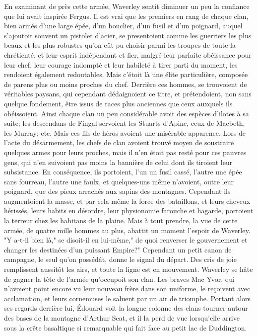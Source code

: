 {En examinant de près cette armée, Waverley sentit diminuer un peu la confiance que lui avait inspirée Fergus. Il est vrai que les premiers en rang de chaque clan, bien armés d'une large épée, d'un bouclier, d'un fusil et d'un poignard, auquel s'ajoutoit souvent un pistolet d'acier, se presentoient\setcounter{page}{234} comme les guerriers les plus beaux et les plus robustes qu’on eût pu choisir parmi les troupes de toute la chrétienté, et leur esprit indépendant et fier, malgré leur parfaite obéissance pour leur chef, leur courage indompté et leur habileté à tirer parti du moment, les rendoient également redoutables. Mais c’étoit là une élite particulière, composée de parens plus ou moins proches du chef. Derrière ces hommes, se trouvoient de véritables paysans, qui cependant dédaignoient ce titre, et prétendoient, non sans quelque fondement, être issus de races plus anciennes que ceux auxquels ils obéissoient. Ainsi chaque clan un peu considérable avoit des espèces d’ilotes à sa suite; les descendans de Fingal servoient les Stuarts d’Apine, ceux de Macbeth, les Murray; etc. Mais ces fils de héros avoient une misérable apparence. Lors de l’acte du désarmement, les chefs de clan avoient trouvé moyen de soustraire quelques armes pour leurs proches, mais il n’en étoit pas resté pour ces pauvres gens, qui n’en suivoient pas moins la bannière de celui dont ils tiroient leur subsistance. En conséquence, ils portoient, l’un un fusil cassé, l’autre une épée sans fourreau, l’autre une faulx, et quelques-uns même n’avoient, outre leur poignard, que des pieux arrachés aux sapins\setcounter{page}{235} des montagnes. Cependant ils augmentoient la masse, et par cela même la force des bataillons, et leurs cheveux hérissés, leurs habits en désordre, leur physionomie farouche et hagarde, portoient la terreur chez les habitans de la plaine. Mais à tout prendre, la vue de cette armée, de quatre mille hommes au plus, abattit un moment l'espoir de Waverley. "Y a-t-il bien là," se disoit-il en lui-même," de quoi renverser le gouvernement et changer les destinées d'un puissant Empire?"
Cependant un petit canon de campagne, le seul qu'on possédât, donne le signal du départ. Des cris de joie remplissent aussitôt les airs, et toute la ligne est en mouvement. Waverley se hâte de gagner la tête de l'armée qu'occupoit son clan. Les braves Mac Yvor, qui n'avoient point encore vu leur nouveau frère dans son uniforme, le reçoivent avec acclamation, et leurs cornemuses le saluent par un air de triomphe. Portant alors ses regards derrière lui, Édouard voit la longue colonne des clans tourner autour des bases de la montagne d'Arthur Seat, et il la perd de vue lorsqu'elle arrive sous la crête basaltique si remarquable qui fait face au petit lac de Duddington.
}
